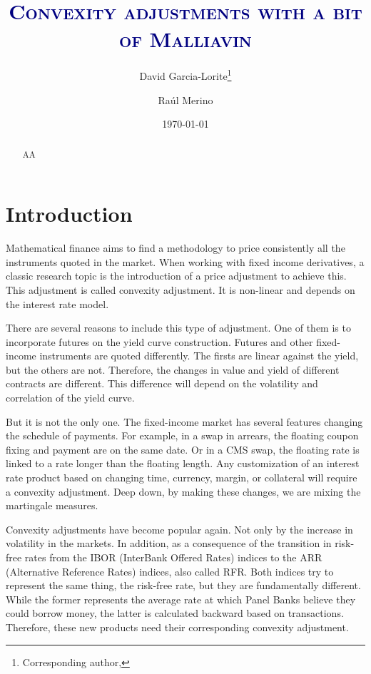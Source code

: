 \documentclass[a4paper,10pt]{article}
\title{\textcolor{Navy}{\textsc{Convexity adjustments with a bit of Malliavin}}}
\author[1,2]{David Garcia-Lorite\thanks{Corresponding author, \email{dddd@caixabank.es}}}
\author[3]{Ra\'{u}l Merino}
\affil[1]{CaixaBank,....}
\affil[2]{Facultat de Matem\`{a}tiques i Inform\`{a}tica, Universitat de Barcelona, \authorcr Gran Via 585, 08007 Barcelona, Spain,\vspace*{3pt}}
\affil[3]{VidaCaixa S.A., Market Risk Management Unit, \authorcr C/Juan Gris, 2-8, 08014 Barcelona, Spain.}
\date{\normalfont\small\today}
\newcommand{\TODO}[1]{\textbf{\color{red}TODO: {#1}}\PackageWarning{TODO:}{#1!}}
\newcommand{\1}{\mathbf{1}}
\newcommand{\ccode}[2]{\par
        \vspace*{8pt}
        {{\leftskip18pt\rightskip\leftskip
        \noindent{\it #1}\/: #2\par}}\par}
\newcommand{\keywords}[1]{\ccode{Keywords}{#1}}
\begin{document}
\maketitle
\begin{abstract}
AA
\end{abstract}


\section{Introduction}
Mathematical finance aims to find a methodology to price consistently all the instruments quoted in the market. When working with fixed income derivatives, a classic research topic is the introduction of a price adjustment to achieve this. This adjustment is called convexity adjustment. It is non-linear and depends on the interest rate model.  

There are several reasons to include this type of adjustment. One of them is to incorporate futures on the yield curve construction. Futures and other fixed-income instruments are quoted differently. The firsts are linear against the yield, but the others are not. Therefore, the changes in value and yield of different contracts are different. This difference will depend on the volatility and correlation of the yield curve.

But it is not the only one. The fixed-income market has several features changing the schedule of payments. For example, in a swap in arrears, the floating coupon fixing and payment are on the same date. Or in a CMS swap, the floating rate is linked to a rate longer than the floating length. Any customization of an interest rate product based on changing time, currency, margin, or collateral will require a convexity adjustment. Deep down, by making these changes, we are mixing the martingale measures. 

Convexity adjustments have become popular again. Not only by the increase in volatility in the markets. In addition, as a consequence of the transition in risk-free rates from the IBOR (InterBank Offered Rates) indices to the ARR (Alternative Reference Rates) indices, also called RFR. Both indices try to represent the same thing, the risk-free rate, but they are fundamentally different. While the former represents the average rate at which Panel Banks believe they could borrow money, the latter is calculated backward based on transactions. Therefore, these new products need their corresponding convexity adjustment. 
\end{document}
